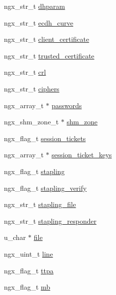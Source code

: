\begin{DoxyCompactItemize}
\item 
ngx\-\_\-str\-\_\-t \hyperlink{structngx__http__ssl__srv__conf__t_a4b39986124b42fc6a6b71e69d1dfc14f}{dhparam}
\item 
ngx\-\_\-str\-\_\-t \hyperlink{structngx__http__ssl__srv__conf__t_ab396307a2621b13d9cab3d544a0ffaa1}{ecdh\-\_\-curve}
\item 
ngx\-\_\-str\-\_\-t \hyperlink{structngx__http__ssl__srv__conf__t_aee2ecc677797ed3bee99896124f3dc0f}{client\-\_\-certificate}
\item 
ngx\-\_\-str\-\_\-t \hyperlink{structngx__http__ssl__srv__conf__t_a6ab6799700d67935b54bd5eb80bdd3b6}{trusted\-\_\-certificate}
\item 
ngx\-\_\-str\-\_\-t \hyperlink{structngx__http__ssl__srv__conf__t_a1898fe47f8b093c83b6ca0d81e4e830a}{crl}
\item 
ngx\-\_\-str\-\_\-t \hyperlink{structngx__http__ssl__srv__conf__t_ad88dded5e7dc5c9f27275e0874336387}{ciphers}
\item 
ngx\-\_\-array\-\_\-t $\ast$ \hyperlink{structngx__http__ssl__srv__conf__t_aca5e5edf300f0534bf6f30497e4f61d6}{passwords}
\item 
ngx\-\_\-shm\-\_\-zone\-\_\-t $\ast$ \hyperlink{structngx__http__ssl__srv__conf__t_a7b57ab691f65d8bc17d99603c98dcac2}{shm\-\_\-zone}
\item 
ngx\-\_\-flag\-\_\-t \hyperlink{structngx__http__ssl__srv__conf__t_a3dd87b7e5fc63d6fd4012c083c0fbed4}{session\-\_\-tickets}
\item 
ngx\-\_\-array\-\_\-t $\ast$ \hyperlink{structngx__http__ssl__srv__conf__t_a1b22a9bc86855bd06a760023a51c1971}{session\-\_\-ticket\-\_\-keys}
\item 
ngx\-\_\-flag\-\_\-t \hyperlink{structngx__http__ssl__srv__conf__t_a7684b59368f17c654d390b846afc55e9}{stapling}
\item 
ngx\-\_\-flag\-\_\-t \hyperlink{structngx__http__ssl__srv__conf__t_a19f47b00a444e5e36bbee42760869e51}{stapling\-\_\-verify}
\item 
ngx\-\_\-str\-\_\-t \hyperlink{structngx__http__ssl__srv__conf__t_aaf11bff2bb433f0ecd2dd33700c30598}{stapling\-\_\-file}
\item 
ngx\-\_\-str\-\_\-t \hyperlink{structngx__http__ssl__srv__conf__t_a3da776aa28775569cb974d36cc46456a}{stapling\-\_\-responder}
\item 
u\-\_\-char $\ast$ \hyperlink{structngx__http__ssl__srv__conf__t_a6be682ad45ebf40cd00c056f1849b35a}{file}
\item 
ngx\-\_\-uint\-\_\-t \hyperlink{structngx__http__ssl__srv__conf__t_ae1c9efa192cc69cf445647f0988fdcc4}{line}
\item 
ngx\-\_\-flag\-\_\-t \hyperlink{structngx__http__ssl__srv__conf__t_a65c0d564ab8e2b90cc8bfe67790fb7fb}{ttpa}
\item 
ngx\-\_\-flag\-\_\-t \hyperlink{structngx__http__ssl__srv__conf__t_a77f47f03d4af566170356fcaa10c460d}{mb}
\end{DoxyCompactItemize}


